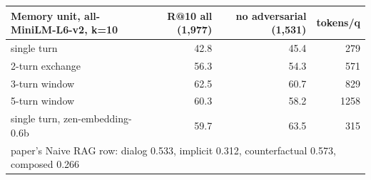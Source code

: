 \begin{tabular}{lrrr}
\toprule
Memory unit, all-MiniLM-L6-v2, k=10 & R@10 all (1,977) & no adversarial (1,531) & tokens/q \\
\midrule
single turn & 42.8 & 45.4 & 279 \\
2-turn exchange & 56.3 & 54.3 & 571 \\
3-turn window & 62.5 & 60.7 & 829 \\
5-turn window & 60.3 & 58.2 & 1258 \\
\midrule
single turn, zen-embedding-0.6b & 59.7 & 63.5 & 315 \\
\midrule
\multicolumn{4}{l}{paper's Naive RAG row: dialog 0.533, implicit 0.312, counterfactual 0.573, composed 0.266} \\
\bottomrule
\end{tabular}
